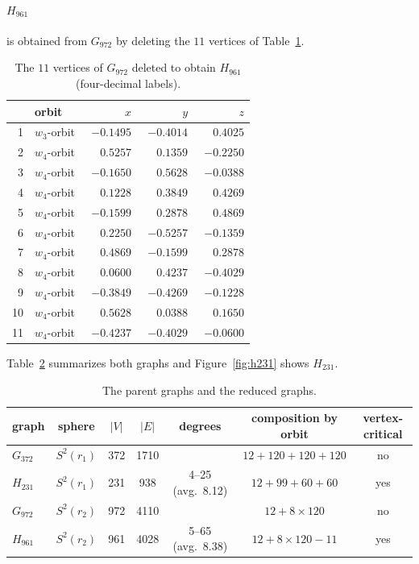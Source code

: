 \documentclass[11pt]{article}
\theoremstyle{remark}
\begin{document}
\paragraph{$H_{961}$} is obtained from $G_{972}$ by deleting the $11$ vertices of Table~\ref{tab:removed}.

\begin{table}[ht]
\centering\small
\begin{tabular}{rlrrr}
\toprule
 & orbit & $x$ & $y$ & $z$\\
\midrule
1 & $w_3$-orbit & $-0.1495$ & $-0.4014$ & $\phantom{-}0.4025$ \\
2 & $w_4$-orbit & $\phantom{-}0.5257$ & $\phantom{-}0.1359$ & $-0.2250$ \\
3 & $w_4$-orbit & $-0.1650$ & $\phantom{-}0.5628$ & $-0.0388$ \\
4 & $w_4$-orbit & $\phantom{-}0.1228$ & $\phantom{-}0.3849$ & $\phantom{-}0.4269$ \\
5 & $w_4$-orbit & $-0.1599$ & $\phantom{-}0.2878$ & $\phantom{-}0.4869$ \\
6 & $w_4$-orbit & $\phantom{-}0.2250$ & $-0.5257$ & $-0.1359$ \\
7 & $w_4$-orbit & $\phantom{-}0.4869$ & $-0.1599$ & $\phantom{-}0.2878$ \\
8 & $w_4$-orbit & $\phantom{-}0.0600$ & $\phantom{-}0.4237$ & $-0.4029$ \\
9 & $w_4$-orbit & $-0.3849$ & $-0.4269$ & $-0.1228$ \\
10 & $w_4$-orbit & $\phantom{-}0.5628$ & $\phantom{-}0.0388$ & $\phantom{-}0.1650$ \\
11 & $w_4$-orbit & $-0.4237$ & $-0.4029$ & $-0.0600$ \\
\bottomrule
\end{tabular}
\caption{The $11$ vertices of $G_{972}$ deleted to obtain $H_{961}$ (four-decimal labels).}
\label{tab:removed}
\end{table}

Table~\ref{tab:summary} summarizes both graphs and Figure~\ref{fig:h231} shows $H_{231}$.

\begin{table}[ht]
\centering\small
\begin{tabular}{lcccccc}
\toprule
graph & sphere & $|V|$ & $|E|$ & degrees & composition by orbit & vertex-critical \\
\midrule
$G_{372}$~\cite{VND2022} & $S^2(r_1)$ & 372 & 1710 & & $12+120+120+120$ & no \\
$H_{231}$ & $S^2(r_1)$ & 231 & 938 & 4--25 (avg.\ 8.12) & $12+99+60+60$ & yes \\
\midrule
$G_{972}$~\cite{VND2022} & $S^2(r_2)$ & 972 & 4110 & & $12+8\times120$ & no \\
$H_{961}$ & $S^2(r_2)$ & 961 & 4028 & 5--65 (avg.\ 8.38) & $12+8\times120-11$ & yes \\
\bottomrule
\end{tabular}
\caption{The parent graphs and the reduced graphs.}
\label{tab:summary}
\end{table}
\end{document}
